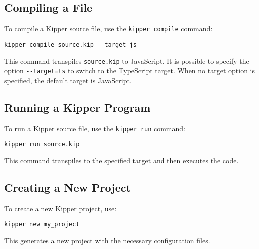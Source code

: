 \subsection{Compiling a File}
\label{subsec:cli_compile}

To compile a Kipper source file, use the \lstinline|kipper compile| command:

\begin{lstlisting}[caption=Compiling a Kipper file, label=lst:cli_compile]
kipper compile source.kip --target js
\end{lstlisting}

This command \gls{transpile}s \lstinline|source.kip| to JavaScript. It is possible to specify the option \lstinline|--target=ts| to switch to the TypeScript target. When no target option is specified, the default target is JavaScript.

\subsection{Running a Kipper Program}

To run a Kipper source file, use the \lstinline|kipper run| command:

\begin{lstlisting}[caption=Running a Kipper file, label=lst:cli_run]
kipper run source.kip
\end{lstlisting}

This command \gls{transpile}s to the specified target and then executes the code.

\subsection{Creating a New Project}
\label{subsec:cli_new_project}

To create a new Kipper project, use:

\begin{lstlisting}[caption=Creating a new Kipper project with a default file setup and config file, label=lst:cli_new_project]
kipper new my_project
\end{lstlisting}

This generates a new project with the necessary configuration files.

